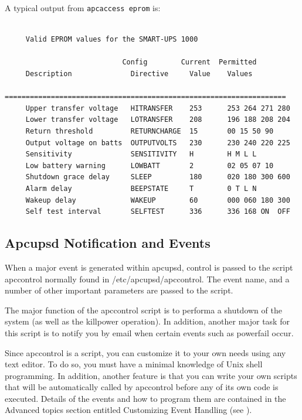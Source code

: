 {{{{A typical output from {\tt apcaccess eprom} is: 

\footnotesize
\begin{verbatim}
     
     Valid EPROM values for the SMART-UPS 1000
     
                            Config        Current  Permitted
     Description              Directive     Value    Values
     ===================================================================
     Upper transfer voltage   HITRANSFER    253      253 264 271 280
     Lower transfer voltage   LOTRANSFER    208      196 188 208 204
     Return threshold         RETURNCHARGE  15       00 15 50 90
     Output voltage on batts  OUTPUTVOLTS   230      230 240 220 225
     Sensitivity              SENSITIVITY   H        H M L L
     Low battery warning      LOWBATT       2        02 05 07 10
     Shutdown grace delay     SLEEP         180      020 180 300 600
     Alarm delay              BEEPSTATE     T        0 T L N
     Wakeup delay             WAKEUP        60       000 060 180 300
     Self test interval       SELFTEST      336      336 168 ON  OFF
\end{verbatim}
\normalsize

\label{Apcupsd-Notification-and-Events}

\subsection*{Apcupsd Notification and Events}

\label{index-Notification-116}
\label{index-Events-117}
When a major event is generated within apcupsd, control is passed to the
script apccontrol normally found in /etc/apcupsd/apccontrol. The event name,
and a number of other important parameters are passed to the script.  

The major function of the apccontrol script is to performa a shutdown of the
system (as well as the killpower operation). In addition, another major task
for this script is to notify you by email when certain events such as
powerfail occur.  

Since apccontrol is a script, you can customize it to your own needs using any
text editor. To do so, you must have a minimal knowledge of Unix shell
programming. In addition, another feature is that you can write your own
scripts that will be automatically called by apccontrol before any of its own
code is executed. Details of the events and how to program them are contained
in the Advanced topics section entitled Customizing Event Handling (see 
). 

}}}}
